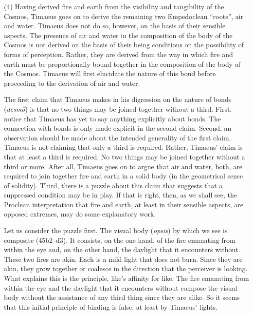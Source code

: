 (4) Having derived fire and earth from the visibility and tangibility of the Cosmos, Timaeus goes on to derive the remaining two Empedoclean ``roots'', air and water. Timae\-us does not do so, however, on the basis of their sensible aspects. The presence of air and water in the composition of the body of the Cosmos is not derived on the basis of their being conditions on the possibility of forms of perception. Rather, they are derived from the way in which fire and earth must be proportionally bound together in the composition of the body of the Cosmos. Timaeus will first elucidate the nature of this bond before proceeding to the derivation of air and water.

The first claim that Timaeus makes in his digression on the nature of bonds (\emph{desmō}) is that no two things may be joined together without a third. First, notice that Timaeus has yet to say anything explicitly about bonds. The connection with bonds is only made explicit in the second claim. Second, an observation should be made about the intended generality of the first claim. Timaeus is not claiming that only a third is required. Rather, Timaeus' claim is that at least a third is required. No two things may be joined together without a third or more. After all, Timaeus goes on to argue that air and water, both, are required to join together fire and earth in a solid body (in the geometrical sense of solidity). Third, there is a puzzle about this claim that suggests that a suppressed condition may be in play. If that is right, then, as we shall see, the Proclean interpretation that fire and earth, at least in their sensible aspects, are opposed extremes, may do some explanatory work.

Let us consider the puzzle first. The visual body (\emph{opsis}) by which we see is composite (45b2--d3). It consists, on the one hand, of the fire emanating from within the eye and, on the other hand, the daylight that it encounters without. These two fires are akin. Each is a mild light that does not burn. Since they are akin, they grow together or coalesce in the direction that the perceiver is looking. What explains this is the principle, like's affinity for like. The fire emanating from within the eye and the daylight that it encounters without compose the visual body without the assistance of any third thing since they are alike. So it seems that this initial principle of binding is false, at least by Timaeus' lights.

